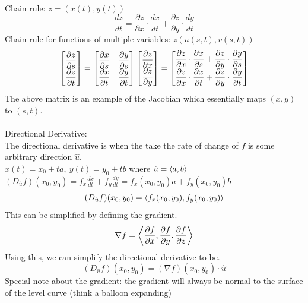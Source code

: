 \documentclass[11pt, fleqn]{article}
\begin{document}
\\
Chain rule: $z=(x(t),y(t))$
$$\frac{dz}{dt}=\frac{\partial z}{\partial x}\cdot\frac{dx}{dt}+\frac{\partial z}{\partial y}\cdot\frac{dy}{dt}$$
Chain rule for functions of multiple variables: $z(u(s,t),v(s,t))$
$$\matrixx{\dfrac{\partial z}{\partial s}\\\dfrac{\partial z}{\partial t}}=\matrixx{\dfrac{\partial x}{\partial s}&\dfrac{\partial y}{\partial s}\\\dfrac{\partial x}{\partial t}&\dfrac{\partial y}{\partial t}}\matrixx{\dfrac{\partial z}{\partial x}\\\dfrac{\partial z}{\partial y}}=\matrixx{\dfrac{\partial z}{\partial x}\cdot\dfrac{\partial x}{\partial s}+\dfrac{\partial z}{\partial y}\cdot\dfrac{\partial y}{\partial s}\\ \dfrac{\partial z}{\partial x}\cdot\dfrac{\partial x}{\partial t}+\dfrac{\partial z}{\partial y}\cdot\dfrac{\partial y}{\partial t}}$$
The above matrix is an example of the Jacobian which essentially maps $(x,y)$ to $(s,t)$.\\
\\
Directional Derivative:\\
The directional derivative is when the take the rate of change of $f$ is some arbitrary direction $\hat{u}$.\\
$x(t)=x_0+ta,\ y(t)=y_0+tb$ where $\hat{u}=\left\langle a,b \right\rangle$\\
$(D_{\hat{u}}f)(x_0,y_0)=f_x\frac{dx}{dt}+f_y\frac{dy}{dt}=f_x(x_0,y_0)a+f_y(x_0,y_0)b$
$$(D_{\hat{u}}f)(x_0,y_0)=\left\langle f_x(x_0,y_0),f_y(x_0,y_0) \right\rangle$$
This can be simplified by defining the gradient.
$$\nabla f=\left\langle \dfrac{\partial f}{\partial x},\dfrac{\partial f}{\partial y},\dfrac{\partial f}{\partial z} \right\rangle$$
Using this, we can simplify the directional derivative to be.
$$(D_{\hat{u}}f)(x_0,y_0)=(\nabla f)(x_0,y_0)\cdot \hat{u}$$
Special note about the gradient: the gradient will always be normal to the surface of the level curve (think a balloon expanding)\\
\end{document}

